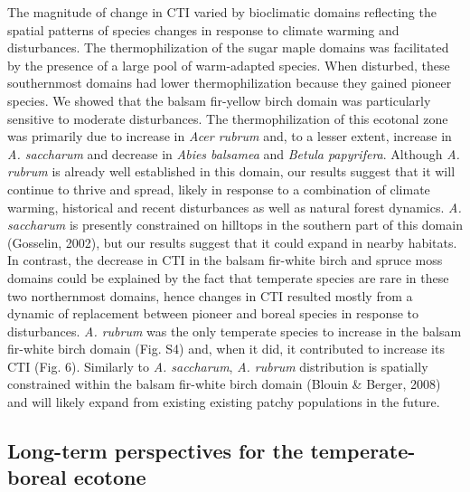 \documentclass[a4paperpaper,]{article}
\begin{document}
The magnitude of change in CTI varied by bioclimatic domains reflecting
the spatial patterns of species changes in response to climate warming
and disturbances. The thermophilization of the sugar maple domains was
facilitated by the presence of a large pool of warm-adapted species.
When disturbed, these southernmost domains had lower thermophilization
because they gained pioneer species. We showed that the balsam
fir-yellow birch domain was particularly sensitive to moderate
disturbances. The thermophilization of this ecotonal zone was primarily
due to increase in \emph{Acer rubrum} and, to a lesser extent, increase
in \emph{A. saccharum} and decrease in \emph{Abies balsamea} and
\emph{Betula papyrifera}. Although \emph{A. rubrum} is already well
established in this domain, our results suggest that it will continue to
thrive and spread, likely in response to a combination of climate
warming, historical and recent disturbances as well as natural forest
dynamics. \emph{A. saccharum} is presently constrained on hilltops in
the southern part of this domain (Gosselin, 2002), but our results
suggest that it could expand in nearby habitats. In contrast, the
decrease in CTI in the balsam fir-white birch and spruce moss domains
could be explained by the fact that temperate species are rare in these
two northernmost domains, hence changes in CTI resulted mostly from a
dynamic of replacement between pioneer and boreal species in response to
disturbances. \emph{A. rubrum} was the only temperate species to
increase in the balsam fir-white birch domain (Fig. S4) and, when it
did, it contributed to increase its CTI (Fig. 6). Similarly to \emph{A.
saccharum}, \emph{A. rubrum} distribution is spatially constrained
within the balsam fir-white birch domain (Blouin \& Berger, 2008) and
will likely expand from existing existing patchy populations in the
future.

\hypertarget{long-term-perspectives-for-the-temperate-boreal-ecotone}{%
\subsection{Long-term perspectives for the temperate-boreal
ecotone}\label{long-term-perspectives-for-the-temperate-boreal-ecotone}}
\end{document}
